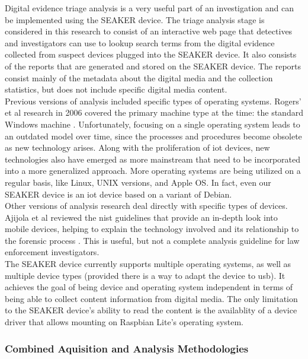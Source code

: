 \documentclass[12pt]{article}
\begin{document}
Digital evidence triage analysis is a very useful part of an investigation and can be 
implemented using the SEAKER device.  The triage analysis stage is considered in this research
to consist of an interactive web page that detectives and investigators can use to 
lookup search terms from the digital evidence collected from suspect devices plugged into the
SEAKER device.  It also consists of the reports that are generated and stored on the
SEAKER device.  The reports consist mainly of the metadata about the digital media and the
collection statistics, but does not include specific digital media content.\\

Previous versions of analysis included specific types of operating systems.
Rogers' et al research in 2006 covered the primary machine type at the time: the standard
Windows machine \cite{rogers2006computer}.  Unfortunately, focusing on a single operating system
leads to an outdated model over time, since the processes and procedures become obsolete as
new technology arises.  Along with the proliferation of \gls{iot} devices, new technologies
also have emerged as more mainstream that need to be incorporated into a more generalized
approach.  More operating systems are being utilized on a regular basis, like Linux, UNIX
versions, and Apple OS.  In fact, even our SEAKER device is an \gls{iot} device based on a
variant of Debian.\\

Other versions of analysis research deal directly with specific types of devices.
Ajijola et al reviewed the \gls{nist} guidelines that provide an in-depth
look into mobile devices, helping to explain the technology involved and its
relationship to the forensic process \cite{ajijola2014review}. This is useful, but not a complete analysis
guideline for law enforcement investigators.\\

The SEAKER device currently supports multiple operating systems, as well as multiple
device types (provided there is a way to adapt the device to \gls{usb}). It achieves the goal of
being device and operating system independent in terms of being able to collect content
information from digital media. The only limitation to the SEAKER device's ability
to read the content is the availablity of a device driver that allows mounting on Raspbian
Lite's operating system.\\

\subsubsection{Combined Aquisition and Analysis Methodologies}
\end{document}
